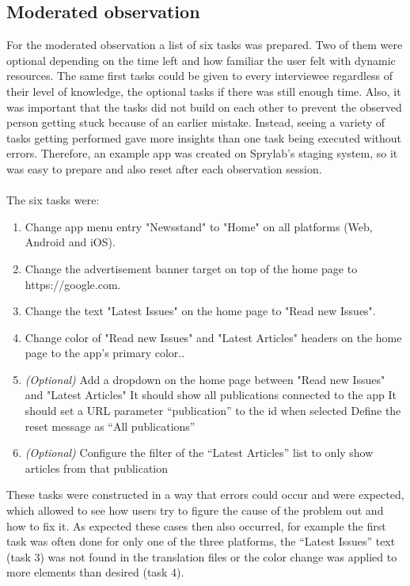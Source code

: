 \subsection{Moderated observation}
\label{subsec:modobs}
For the moderated observation a list of six tasks was prepared. Two of them were optional depending on the time left and how familiar the user felt with dynamic resources.
The same first tasks could be given to every interviewee regardless of their level of knowledge, the optional tasks if there was still enough time.
Also, it was important that the tasks did not build on each other to prevent the observed person getting stuck because of an earlier mistake.
Instead, seeing a variety of tasks getting performed gave more insights than one task being executed without errors. 
Therefore, an example app was created on Sprylab's staging system, so it was easy to prepare and also reset after each observation session.
\\\\
The six tasks were:
\begin{enumerate}[itemsep=0mm]
  \item Change app menu entry "Newsstand" to "Home" on all platforms (Web, Android and iOS).
  \item Change the advertisement banner target on top of the home page to https://google.com. 
  \item Change the text "Latest Issues" on the home page to "Read new Issues".
  \item Change color of "Read new Issues" and "Latest Articles" headers on the home page to the app's primary color..
  \item \textit{(Optional)} Add a dropdown on the home page between "Read new Issues" and "Latest Articles"
    \subitem It should show all publications connected to the app
    \subitem It should set a URL parameter ``publication'' to the id when selected
    \subitem Define the reset message as ``All publications''
  \item \textit{(Optional)} Configure the filter of the ``Latest Articles'' list to only show articles from that publication
\end{enumerate}

These tasks were constructed in a way that errors could occur and were expected, which allowed to see how users try to figure the cause of the problem out and how to fix it.
As expected these cases then also occurred, for example the first task was often done for only one of the three platforms, the ``Latest Issues'' text (task 3) was not found in the translation files or the color change was applied to more elements than desired (task 4).

